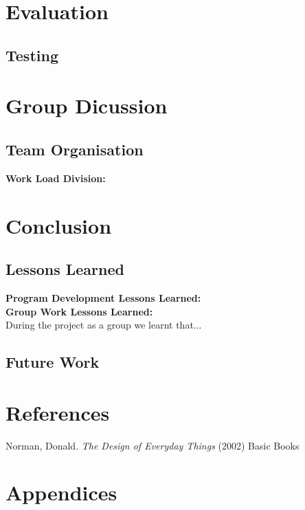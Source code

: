 \documentclass[11pt]{article}
\begin{document}
	\section{Evaluation} %
	\subsection{Testing} %
	\section{Group Dicussion}
	\subsection{Team Organisation} %
	\textbf{Work Load Division:}\\ 
	\section{Conclusion}
	\subsection{Lessons Learned} 
	\textbf{Program Development Lessons Learned:}\\ %
	
	\textbf{Group Work Lessons Learned:}\\ %
	During the project as a group we learnt that...%
	\subsection{Future Work} %
	\section{References}
	
	\begin{thebibliography}{9}
			 Norman, Donald. \emph{The Design of Everyday Things} (2002) Basic Books
	\end{thebibliography}
	

	\section{Appendices} %
\end{document}
